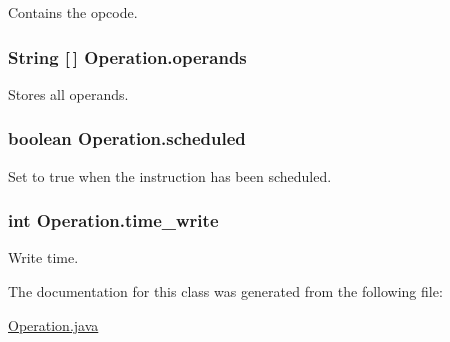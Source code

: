 \-Contains the opcode. 

\hypertarget{classOperation_ae5923860533d63c6a35d658b2683a994}{
\subsubsection[{operands}]{\setlength{\rightskip}{0pt plus 5cm}\-String \mbox{[}$\,$\mbox{]} {\bf \-Operation.\-operands}}}\label{classOperation_ae5923860533d63c6a35d658b2683a994}


\-Stores all operands. 

\hypertarget{classOperation_a1455e6e40b057e3f25e29f7a54c6920f}{
\subsubsection[{scheduled}]{\setlength{\rightskip}{0pt plus 5cm}boolean {\bf \-Operation.\-scheduled}}}\label{classOperation_a1455e6e40b057e3f25e29f7a54c6920f}


\-Set to true when the instruction has been scheduled. 

\hypertarget{classOperation_a53e016dd4e33bdb373ca7d09d5cb8e83}{
\subsubsection[{time\-\_\-write}]{\setlength{\rightskip}{0pt plus 5cm}int {\bf \-Operation.\-time\-\_\-write}}}\label{classOperation_a53e016dd4e33bdb373ca7d09d5cb8e83}


\-Write time. 



\-The documentation for this class was generated from the following file\-:\begin{DoxyCompactItemize}
\item 
\hyperlink{Operation_8java}{\-Operation.\-java}\end{DoxyCompactItemize}

